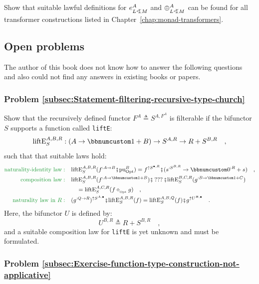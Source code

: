 Show that suitable lawful definitions for $e_{L\varangle M}^{A}$
and $\oplus_{L\varangle M}^{A}$ can be found for all transformer
constructions listed in Chapter~\ref{chap:monad-transformers}.

\subsection{Open problems}

The author of this book does not know how to answer the following
questions and also could not find any answers in existing books or
papers.

\subsubsection{Problem \label{subsec:Statement-filtering-recursive-type-church}\ref{subsec:Statement-filtering-recursive-type-church}}

Show that the recursively defined functor $F^{A}\triangleq S^{A,F^{A}}$
is filterable if the bifunctor $S$ supports a function called \lstinline!liftE!:
\[
\text{liftE}_{S}^{A,B,R}:(A\rightarrow\bbnum 1+B)\rightarrow S^{A,R}\rightarrow R+S^{B,R}\quad,
\]
such that that suitable laws hold:
\begin{align*}
{\color{greenunder}\text{naturality-identity law}:}\quad & \text{liftE}_{S}^{A,B,R}(f^{:A\rightarrow B}\bef\text{pu}_{\text{Opt}}^{B})=f^{\uparrow S^{\bullet,R}}\bef(s^{:S^{B,R}}\rightarrow\bbnum 0^{:R}+s)\quad,\\
{\color{greenunder}\text{composition law}:}\quad & \text{liftE}_{S}^{A,B,R}(f^{:A\rightarrow\bbnum 1+B})\bef\,???\,\bef\text{liftE}_{S}^{B,C,R}(g^{:B\rightarrow\bbnum 1+C})\\
 & \quad=\text{liftE}_{S}^{A,C,R}(f\diamond_{_{\text{Opt}}}g)\quad,\\
{\color{greenunder}\text{naturality law in }R:}\quad & (g^{:Q\rightarrow R})^{\uparrow S^{A,\bullet}}\bef\text{liftE}_{S}^{A,B,R}(f)=\text{liftE}_{S}^{A,B,Q}(f)\bef g^{\uparrow U^{B,\bullet}}\quad.
\end{align*}
Here, the bifunctor $U$ is defined by:
\[
U^{B,R}\triangleq R+S^{B,R}\quad,
\]
and a suitable composition law for \lstinline!liftE! is yet unknown
and must be formulated.

\subsubsection{Problem \label{subsec:Exercise-function-type-construction-not-applicative}\ref{subsec:Exercise-function-type-construction-not-applicative}}

